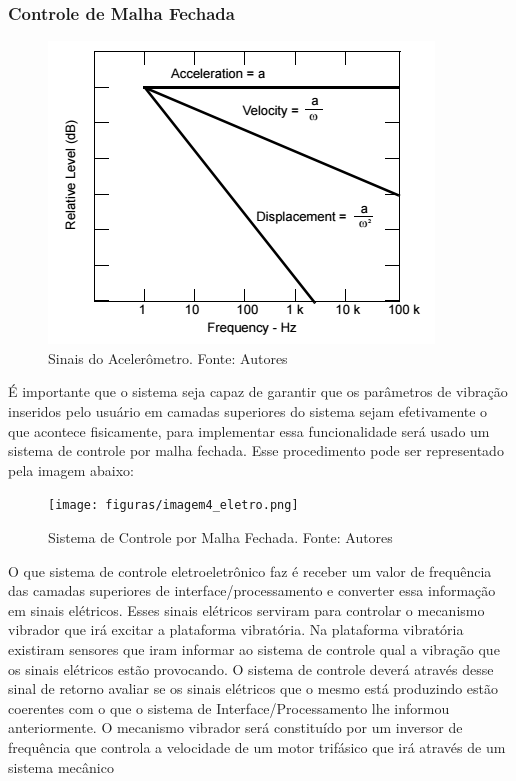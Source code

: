 \subsubsection*{Controle de Malha Fechada}
\begin{figure}[H]
\centering
\includegraphics[scale=0.5]{figuras/imagem1_eletro.png}
\caption{Sinais do Acelerômetro.  Fonte: Autores}
\label{fig:signal_acel}
\end{figure}
É importante que o sistema seja capaz de garantir que os parâmetros de vibração inseridos pelo usuário em camadas superiores do 
sistema sejam efetivamente o que acontece fisicamente, para implementar essa funcionalidade será usado um sistema de controle por
malha fechada. Esse procedimento pode ser representado pela imagem abaixo:
\begin{figure}[H]
\centering
\texttt{[image: figuras/imagem4\_eletro.png]}
\caption{Sistema de Controle por Malha Fechada.  Fonte: Autores}
\label{fig:malha_fecha}
\end{figure}
O que sistema de controle eletroeletrônico faz é receber um valor de frequência das camadas superiores de interface/processamento 
e converter essa informação em sinais elétricos. Esses sinais elétricos serviram para controlar o mecanismo vibrador que irá excitar 
a plataforma vibratória. Na plataforma vibratória existiram sensores que iram informar ao sistema de controle qual a vibração que os 
sinais elétricos estão provocando. O sistema de controle deverá através desse sinal de retorno avaliar se os sinais elétricos que o 
mesmo está produzindo estão coerentes com o que o sistema de Interface/Processamento lhe informou anteriormente. O mecanismo vibrador 
será constituído por um inversor de frequência que controla a velocidade de um motor trifásico que irá através de um sistema mecânico 
